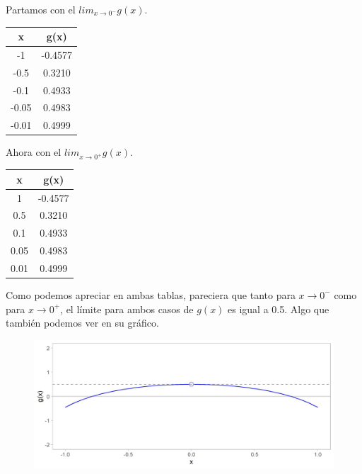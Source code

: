 \documentclass[12pt]{article}
\begin{document}
Partamos con el $lim_{x \to 0^{-}} g(x)$.

\begin{center}

\begin{tabular}{c | c}

x & g(x)\\
\hline
-1 & -0.4577\\
-0.5 & 0.3210\\
-0.1 & 0.4933\\
-0.05 & 0.4983\\
-0.01 & 0.4999\\

\end{tabular}

\end{center}

Ahora con el $lim_{x \to 0^{+}} g(x)$.

\begin{center}

\begin{tabular}{c | c}

x & g(x)\\
\hline
1 & -0.4577\\
0.5 & 0.3210\\
0.1 & 0.4933\\
0.05 & 0.4983\\
0.01 & 0.4999\\

\end{tabular}

\end{center}

Como podemos apreciar en ambas tablas, pareciera que tanto para $x \to 0^{-}$ como para $x \to 0^{+}$, el límite para ambos casos de $g(x)$ es igual a 0.5. Algo que también podemos ver en su gráfico.

\begin{figure}[hbt!]
\centering
\includegraphics[scale=0.7]{img/limit_plot_g.jpg}
\end{figure}
\end{document}
